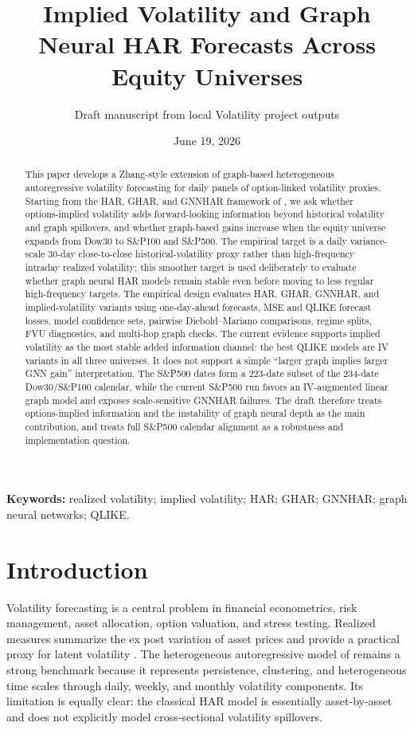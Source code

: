 \documentclass[11pt,a4paper]{article}
\title{\textbf{Implied Volatility and Graph Neural HAR Forecasts Across Equity Universes}}
\author{Draft manuscript from local Volatility project outputs}
\date{June 19, 2026}
\newcommand{\dow}{Dow30}
\newcommand{\spone}{S\&P100}
\newcommand{\spfive}{S\&P500}
\begin{document}
\maketitle

\begin{abstract}
This paper develops a Zhang-style extension of graph-based heterogeneous autoregressive volatility forecasting for daily panels of option-linked volatility proxies.  Starting from the HAR, GHAR, and GNNHAR framework of \citet{zhang2025gnnhar}, we ask whether options-implied volatility adds forward-looking information beyond historical volatility and graph spillovers, and whether graph-based gains increase when the equity universe expands from \dow{} to \spone{} and \spfive{}.  The empirical target is a daily variance-scale 30-day close-to-close historical-volatility proxy rather than high-frequency intraday realized volatility; this smoother target is used deliberately to evaluate whether graph neural HAR models remain stable even before moving to less regular high-frequency targets.  The empirical design evaluates HAR, GHAR, GNNHAR, and implied-volatility variants using one-day-ahead forecasts, MSE and QLIKE forecast losses, model confidence sets, pairwise Diebold--Mariano comparisons, regime splits, FVU diagnostics, and multi-hop graph checks.  The current evidence supports implied volatility as the most stable added information channel: the best QLIKE models are IV variants in all three universes.  It does not support a simple ``larger graph implies larger GNN gain'' interpretation.  The S\&P500 dates form a 223-date subset of the 234-date \dow{}/\spone{} calendar, while the current S\&P500 run favors an IV-augmented linear graph model and exposes scale-sensitive GNNHAR failures.  The draft therefore treats options-implied information and the instability of graph neural depth as the main contribution, and treats full S\&P500 calendar alignment as a robustness and implementation question.
\end{abstract}

\noindent\textbf{Keywords:} realized volatility; implied volatility; HAR; GHAR; GNNHAR; graph neural networks; QLIKE.

\section{Introduction}
\label{sec:introduction}

Volatility forecasting is a central problem in financial econometrics, risk management, asset allocation, option valuation, and stress testing.  Realized measures summarize the ex post variation of asset prices and provide a practical proxy for latent volatility \citep{andersen2001distribution,barndorff2002econometric}.  The heterogeneous autoregressive model of \citet{corsi2009har} remains a strong benchmark because it represents persistence, clustering, and heterogeneous time scales through daily, weekly, and monthly volatility components.  Its limitation is equally clear: the classical HAR model is essentially asset-by-asset and does not explicitly model cross-sectional volatility spillovers.
\end{document}
